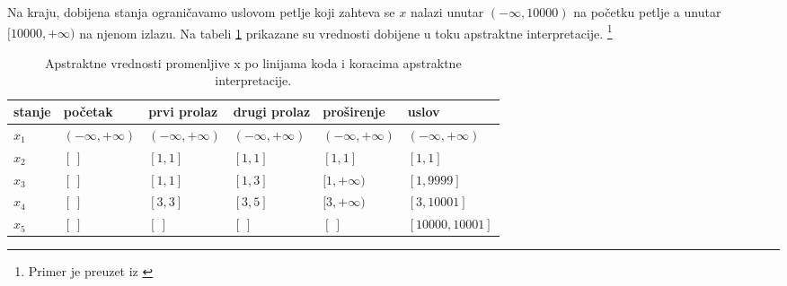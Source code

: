 

Na kraju, dobijena stanja ograničavamo uslovom petlje koji zahteva se $x$ nalazi unutar $(-\infty, 10000)$ na početku petlje a unutar $[10000, +\infty)$ na njenom izlazu. Na tabeli \ref{tab:tabela1} prikazane su vrednosti dobijene u toku apstraktne interpretacije. \footnote{Primer je preuzet iz \cite{boulanger}}


\begin{table}[H]
\begin{center}
\caption{Apstraktne vrednosti promenljive x po linijama koda i koracima apstraktne interpretacije.}
\begin{tabular}{|l|l|l|l|l|l|} \hline
stanje& početak& prvi prolaz & drugi prolaz & proširenje & uslov\\ \hline
$x_1$ & $(-\infty, +\infty)$ & $(-\infty, +\infty)$ & $(-\infty, +\infty)$ & $(-\infty, +\infty)$ & $(-\infty, +\infty)$ \\ 
$x_2$ & $[\:]$ & $[1,1]$ & $[1,1]$ & $[1,1]$ & $[1,1]$ \\
$x_3$ & $[\:]$ & $[1,1]$ & $[1,3]$ & $[1,+\infty)$ & $[1,9999]$ \\
$x_4$ & $[\:]$ & $[3,3]$ & $[3,5]$ & $[3,+\infty)$ & $[3,10001]$ \\
$x_5$ & $[\:]$ & $[\:]$ & $[\:]$ & $[\:]$ & $[10000,10001]$ \\ \hline
\end{tabular}
\label{tab:tabela1}
\end{center}
\end{table}

